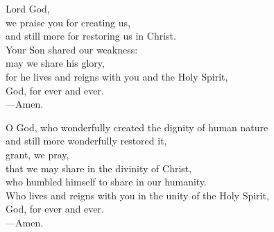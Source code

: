 \prayer

\begin{prayerverse}

Lord God,\\
we praise you for creating us,\\
and still more for restoring us in Christ.\\
Your Son shared our weakness:\\
may we share his glory,\\
for he lives and reigns with you and the Holy Spirit,\\
God, for ever and ever.\\
{\color{red}---\thinspace}Amen.

\end{prayerverse}


\begin{prayerverse}

O God, who wonderfully created the dignity of human nature\\
and still more wonderfully restored it,\\
grant, we pray,\\
that we may share in the divinity of Christ,\\
who humbled himself to share in our humanity.\\
Who lives and reigns with you in the unity of the Holy Spirit,\\
God, for ever and ever.\\
{\color{red}---\thinspace}Amen.

\end{prayerverse}